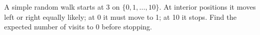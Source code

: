 A simple random walk starts at 3 on $\{0,1,\ldots,10\}$. At interior positions it moves left or right equally likely; at 0 it must move to 1; at 10 it stops. Find the expected number of visits to 0 before stopping.
